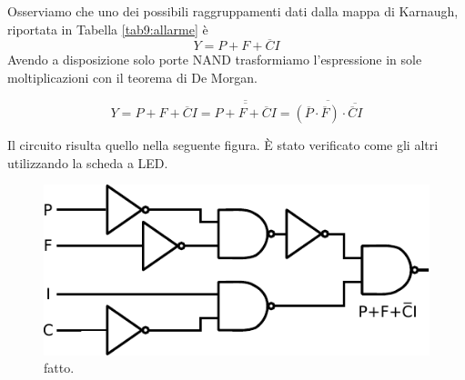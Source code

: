 Osserviamo che uno dei possibili raggruppamenti dati dalla mappa di Karnaugh, riportata in Tabella \ref{tab9:allarme} è
$$Y=P+F+\overline C I$$
Avendo a disposizione solo porte NAND trasformiamo l'espressione in sole moltiplicazioni con il teorema di De Morgan.

$$Y=P+F+\overline C I=\overline{\overline{P+F+\overline C I}}=\overline{(\overline P \cdot \overline F) \cdot \overline{\overline C I}}$$ 

Il circuito risulta quello nella seguente figura.
È stato verificato come gli altri utilizzando la scheda a LED.

\begin{figure}[htpc]
\centering
\includegraphics[width=.65\textwidth]{../E09/latex/allarme.pdf}
\caption{fatto.}
\label{cir9:allarme}
\end{figure}
